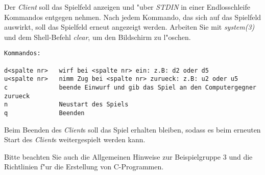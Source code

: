 \documentclass{article}
\begin{document}
Der \emph{Client} soll das Spielfeld anzeigen und "uber \emph{STDIN} in einer Endlosschleife Kommandos entgegen nehmen. Nach jedem Kommando, das sich auf das Spielfeld auswirkt, soll das Spielfeld erneut angezeigt werden. Arbeiten Sie mit \emph{system(3)} und dem Shell-Befehl \emph{clear}, um den Bildschirm zu l"oschen.
\begin{verbatim}
Kommandos:

d<spalte nr>   wirf bei <spalte nr> ein: z.B: d2 oder d5
u<spalte nr>   nimm Zug bei <spalte nr> zurueck: z.B: u2 oder u5
c              beende Einwurf und gib das Spiel an den Computergegner zurueck
n              Neustart des Spiels
q              Beenden
\end{verbatim}

Beim Beenden des \emph{Client}s soll das Spiel erhalten bleiben, sodass es beim erneuten Start des \emph{Client}s weitergespielt werden kann.



Bitte beachten Sie auch die Allgemeinen Hinweise zur Beispielgruppe 3 und die Richtlinien f"ur die Erstellung von C-Programmen.
\end{document}
